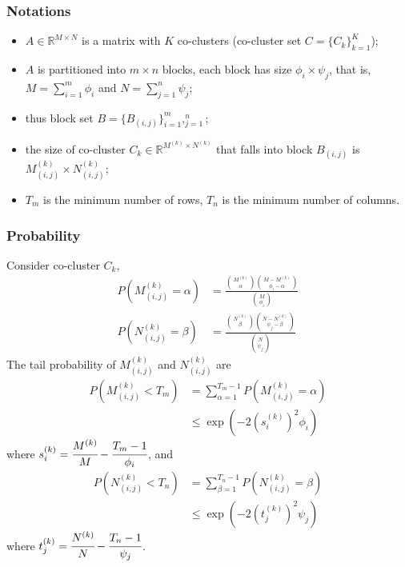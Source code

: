 \documentclass[journal]{IEEEtran}
\begin{document}
\subsubsection{Notations}
\label{subsec:probability}
\begin{itemize}
  \item $A \in \mathbb{R}^{M \times N}$ is a matrix with $K$ co-clusters (co-cluster set $C = \{C_k\}_{k=1}^K$);
  \item $A$ is partitioned into $m \times n$ blocks, each block has size $\phi_i \times \psi_j$, that is, $M=\sum_{i=1}^m \phi_i$ and $N=\sum_{j=1}^n \psi_j$;
  \item thus block set $B = \{B_{(i,j)}\}_{i=1}^m,_{j=1}^n$;
  \item the size of co-cluster $C_k \in \mathbb{R}^{M^{(k)} \times N^{(k)}}$ that falls into block $B_{(i,j)}$ is $M_{(i,j)}^{(k)} \times N_{(i,j)}^{(k)}$;
  \item $T_m$ is the minimum number of rows, $T_n$ is the minimum number of columns.
\end{itemize}

\subsubsection{Probability}
Consider co-cluster $C_k$,
\begin{align*}
  P(M_{(i,j)}^{(k)} = \alpha) & = \frac{\binom{M^{(k)}}{\alpha} \binom{M-M^{(k)}}{\phi_i-\alpha}}{\binom{M}{\phi_i}} \\
  P(N_{(i,j)}^{(k)} = \beta)  & = \frac{\binom{N^{(k)}}{\beta} \binom{N-N^{(k)}}{\psi_j-\beta}}{\binom{N}{\psi_j}}
\end{align*}
The tail probability of $M_{(i,j)}^{(k)}$ and $N_{(i,j)}^{(k)}$ are
\begin{align*}
  P(M_{(i,j)}^{(k)} < T_m) & = \sum_{\alpha=1}^{T_m-1} P(M_{(i,j)}^{(k)} = \alpha) \\
                           & \le \exp(-2 (s_i^{(k)})^2 \phi_i)
\end{align*}
where $s_i^{(k)} = \cfrac{M^{(k)}}{M}-\cfrac{T_m-1}{\phi_i}$, and
\begin{align*}
  P(N_{(i,j)}^{(k)} < T_n) & = \sum_{\beta=1}^{T_n-1} P(N_{(i,j)}^{(k)} = \beta) \\
                           & \le \exp (-2 (t_j^{(k)})^2 \psi_j)
\end{align*}
where $t_j^{(k)} = \cfrac{N^{(k)}}{N}-\cfrac{T_n-1}{\psi_j}$.
\end{document}
